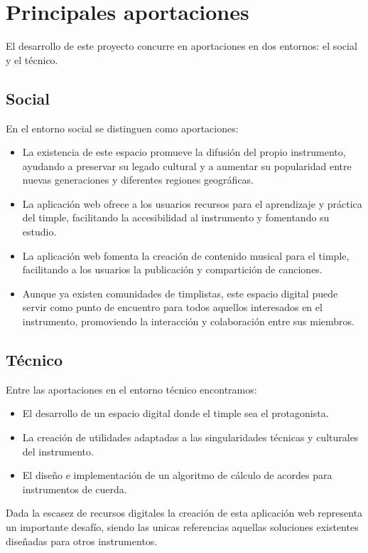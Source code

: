 \section{Principales aportaciones}
El desarrollo de este proyecto concurre en aportaciones en dos entornos: el social y el técnico.

\subsection{Social}
En el entorno social se distinguen como aportaciones:

\begin{itemize}
    \item La existencia de este espacio promueve la difusión del propio instrumento, ayudando a preservar su legado cultural y a aumentar su popularidad entre nuevas generaciones y diferentes regiones geográficas.

    \item La aplicación web ofrece a los usuarios recursos para el aprendizaje y práctica del timple, facilitando la accesibilidad al instrumento y fomentando su estudio.

    \item La aplicación web fomenta la creación de contenido musical para el timple, facilitando a los usuarios la publicación y compartición de canciones.

    \item Aunque ya existen comunidades de timplistas, este espacio digital puede servir como punto de encuentro para todos aquellos interesados en el instrumento, promoviendo la interacción y colaboración entre sus miembros.
\end{itemize}

\subsection{Técnico}

Entre las aportaciones en el entorno técnico encontramos:

\begin{itemize}
    \item El desarrollo de un espacio digital donde el timple sea el protagonista.
    \item La creación de utilidades adaptadas a las singularidades técnicas y culturales del instrumento.
    \item El diseño e implementación de un algoritmo de cálculo de acordes para instrumentos de cuerda.
\end{itemize}

Dada la escasez de recursos digitales la creación de esta aplicación web representa un importante desafío, siendo las unicas referencias aquellas soluciones existentes diseñadas para otros instrumentos.

